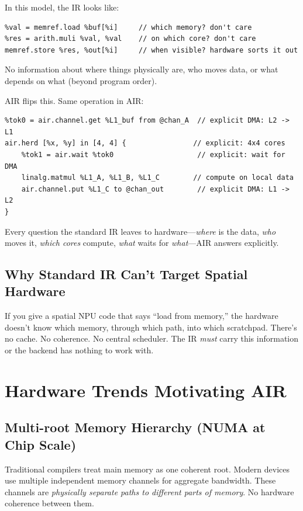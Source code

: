 \documentclass[11pt,a4paper]{article}
\begin{document}
In this model, the IR looks like:
\begin{lstlisting}
%val = memref.load %buf[%i]     // which memory? don't care
%res = arith.muli %val, %val    // on which core? don't care
memref.store %res, %out[%i]     // when visible? hardware sorts it out
\end{lstlisting}

No information about where things physically are, who moves data, or what depends on
what (beyond program order).

AIR flips this. Same operation in AIR:
\begin{lstlisting}
%tok0 = air.channel.get %L1_buf from @chan_A  // explicit DMA: L2 -> L1
air.herd [%x, %y] in [4, 4] {                // explicit: 4x4 cores
    %tok1 = air.wait %tok0                    // explicit: wait for DMA
    linalg.matmul %L1_A, %L1_B, %L1_C        // compute on local data
    air.channel.put %L1_C to @chan_out        // explicit DMA: L1 -> L2
}
\end{lstlisting}

Every question the standard IR leaves to hardware---\emph{where} is the data,
\emph{who} moves it, \emph{which cores} compute, \emph{what} waits for
\emph{what}---AIR answers explicitly.

\subsection{Why Standard IR Can't Target Spatial Hardware}

If you give a spatial NPU code that says ``load from memory,'' the hardware doesn't
know which memory, through which path, into which scratchpad. There's no cache.
No coherence. No central scheduler. The IR \emph{must} carry this information or the
backend has nothing to work with.


\section{Hardware Trends Motivating AIR}

\subsection{Multi-root Memory Hierarchy (NUMA at Chip Scale)}

Traditional compilers treat main memory as one coherent root. Modern devices use
multiple independent memory channels for aggregate bandwidth. These channels are
\emph{physically separate paths to different parts of memory}. No hardware coherence
between them.
\end{document}
